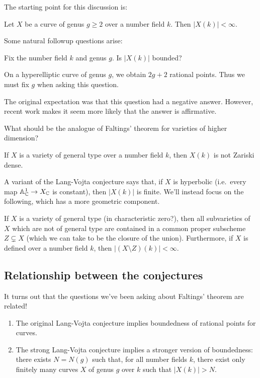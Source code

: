 \documentclass{article}
\begin{document}
The starting point for this discussion is:

\begin{thm}[Faltings]
	Let $X$ be a curve of genus $g \geq 2$ over a number field $k$.
	Then $|X(k)| < \infty$.
\end{thm}

Some natural followup questions arise:

\begin{qn}
	Fix the number field $k$ and genus $g$.
	Is $|X(k)|$ bounded?
\end{qn}

On a hyperelliptic curve of genus $g$, we obtain $2g + 2$ rational points.
Thus we must fix $g$ when asking this question.

The original expectation was that this question had a negative answer.
However, recent work makes it seem more likely that the answer is affirmative.

\begin{qn}
	What should be the analogue of Faltings' theorem for varieties of higher dimension?
\end{qn}

\begin{conj}
	If $X$ is a variety of general type over a number field $k$, then $X(k)$ is not Zariski dense.
\end{conj}

A variant of the Lang-Vojta conjecture says that, if $X$ is hyperbolic (i.e.\ every map $\mathbb{A}^1_{\mathbb{C}} \to X_{\mathbb{C}}$ is constant), then $|X(k)|$ is finite.
We'll instead focus on the following, which has a more geometric component. 

\begin{conj}
	If $X$ is a variety of general type (in characteristic zero?), then all subvarieties of $X$ which are not of general type are contained in a common proper subscheme $Z \subsetneq X$ (which we can take to be the closure of the union).
	Furthermore, if $X$ is defined over a number field $k$, then $|(X \setminus Z)(k)| < \infty$.
\end{conj}

\subsection{Relationship between the conjectures}

It turns out that the questions we've been asking about Faltings' theorem are related!

\begin{thm}
	\begin{enumerate}
		\item The original Lang-Vojta conjecture implies boundedness of rational points for curves.
		\item The strong Lang-Vojta conjecture implies a stronger version of boundedness: there exists $N = N(g)$ such that, for all number fields $k$, there exist only finitely many curves $X$ of genus $g$ over $k$ such that $|X(k)| > N$.
	\end{enumerate}
\end{thm}
\end{document}
